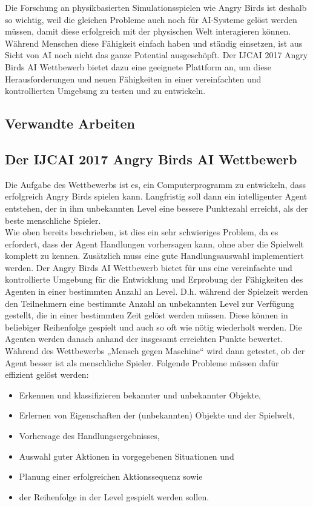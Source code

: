 Die Forschung an physikbasierten Simulationsspielen wie Angry Birds ist deshalb so wichtig, weil die gleichen Probleme auch noch für AI-Systeme gelöst werden müssen, damit diese erfolgreich mit der physischen Welt interagieren können. Während Menschen diese Fähigkeit einfach haben und ständig einsetzen, ist aus Sicht von AI noch nicht das ganze Potential ausgeschöpft. Der IJCAI 2017 Angry Birds AI Wettbewerb bietet dazu eine geeignete Plattform an, um diese Herausforderungen und neuen Fähigkeiten in einer vereinfachten und kontrollierten Umgebung zu testen und zu entwickeln.

\subsection{Verwandte Arbeiten}

\subsection{Der IJCAI 2017 Angry Birds AI Wettbewerb}
Die Aufgabe des Wettbewerbs ist es, ein Computerprogramm zu entwickeln, dass erfolgreich Angry Birds spielen kann. Langfristig soll dann ein intelligenter Agent entstehen, der in ihm unbekannten Level eine bessere Punktezahl erreicht, als der beste menschliche Spieler.\\
Wie oben bereits beschrieben, ist dies ein sehr schwieriges Problem, da es erfordert, dass der Agent Handlungen vorhersagen kann, ohne aber die Spielwelt komplett zu kennen. Zusätzlich muss eine gute Handlungsauswahl implementiert werden.
Der Angry Birds AI Wettbewerb bietet für uns eine vereinfachte und kontrollierte Umgebung für die Entwicklung und Erprobung der Fähigkeiten des Agenten in einer bestimmten Anzahl an Level. D.h. während der Spielzeit werden den Teilnehmern eine bestimmte Anzahl an unbekannten Level zur Verfügung gestellt, die in einer bestimmten Zeit gelöst werden müssen. Diese können in beliebiger Reihenfolge gespielt und auch so oft wie nötig wiederholt werden. Die Agenten werden danach anhand der insgesamt erreichten Punkte bewertet. Während des Wettbewerbs „Mensch gegen Maschine“ wird dann getestet, ob der Agent besser ist als menschliche Spieler. Folgende Probleme müssen dafür effizient gelöst werden:

\begin{itemize}
\item Erkennen und klassifizieren bekannter und unbekannter Objekte,
\item Erlernen von Eigenschaften der (unbekannten) Objekte und der Spielwelt,
\item Vorhersage des Handlungsergebnisses,
\item Auswahl guter Aktionen in vorgegebenen Situationen und
\item Planung einer erfolgreichen Aktionssequenz sowie
\item  der Reihenfolge in der Level gespielt werden sollen.
\end{itemize}

